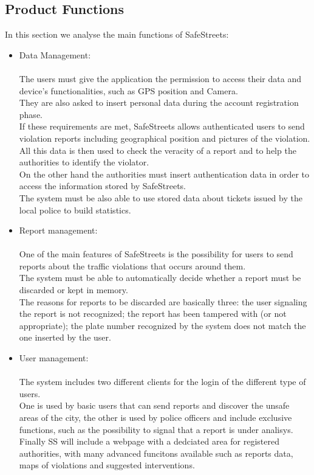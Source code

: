 \subsection{Product Functions}
In this section we analyse the main functions of SafeStreets: 
\begin{itemize}
	\item Data Management: \\ \\
	The users must give the application the permission to access their data and device’s functionalities, such as GPS position and Camera. \\
	They are also asked to insert personal data during the account registration phase. \\
	If these requirements are met, SafeStreets allows authenticated users to send violation reports including geographical position and pictures of the violation. \\
	All this data is then used to check the veracity of a report and to help the authorities to identify the violator. \\
	On the other hand the authorities must insert authentication data in order to access the information stored by SafeStreets. \\
	The system must be also able to use stored data about tickets issued by the local police to build statistics.
	
	\item Report management: \\ \\
	One of the main features of SafeStreets is the possibility for users to send reports about the traffic violations that occurs around them. \\
	The system must be able to automatically decide whether a report must be discarded or kept in memory. \\
	The reasons for reports to be discarded are basically three: the user signaling the report is not recognized; the report has been tampered with (or not appropriate); the plate number recognized by the system does not match the one inserted by the user. 
	
	\item User management: \\ \\
	The system includes two different clients for the login of the different type of users. \\
	One is used by basic users that can send reports and discover the unsafe areas of the city, the other is used by police officers and include exclusive functions, such as the possibility to signal that a report is under analisys. \\
	Finally SS will include a webpage with a dedciated area for registered authorities, with many advanced funcitons available such as  reports data, maps of violations and suggested interventions. \\
	

\end{itemize}
